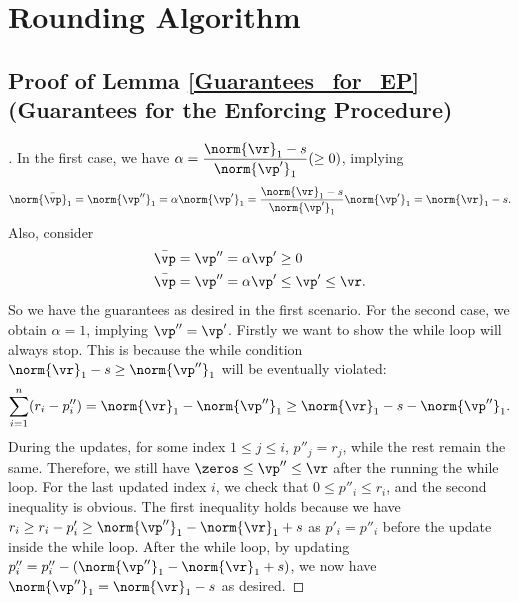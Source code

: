 \section{Rounding Algorithm} 
\subsection{Proof of Lemma \ref{Guarantees_for_EP} (Guarantees for the Enforcing Procedure)}
\begin{proof}[\unskip \nopunct]
    In the first case, we have $\alpha = \dfrac{\norm{\vr}_1-s}{\norm{\vp'}_1} (\geq 0)$, implying
    \begin{align*}
        \norm{\bar{\vp}}_1 = \norm{\vp''}_1 = \alpha \norm{\vp'}_1 = \frac{\norm{\vr}_1-s}{\norm{\vp'}_1} \norm{\vp'}_1 = \norm{\vr}_1-s.
    \end{align*}
    Also, consider 
    \begin{align*}
        &\bar{\vp} = \vp'' = \alpha \vp' \geq 0 \\
        &\bar{\vp} = \vp'' = \alpha \vp' \leq \vp' \leq \vr.
    \end{align*}
    So we have the guarantees as desired in the first scenario. For the second case, we obtain $\alpha = 1$, implying $\vp'' = \vp'$. Firstly we want to show the while loop will always stop. This is because the while condition $\norm{\vr}_1 - s \geq \norm{\vp''}_1 $ will be eventually violated:
    \begin{align*}
        \sum_{i=1}^n (r_i - p''_i) = \norm{\vr}_1 - \norm{\vp''}_1 \geq \norm{\vr}_1 - s - \norm{\vp''}_1. 
    \end{align*}
    During the updates, for some index $1 \leq j \leq i$, $p''_j = r_j$, while the rest remain the same. Therefore, we still have $\zeros \leq \vp'' \leq \vr$ after the running the while loop. For the last updated index $i$, we check that $0 \leq p''_i \leq r_i$, and the second inequality is obvious. The first inequality holds because we have $r_i \geq r_i - p'_i \geq \norm{\vp''}_1 - \norm{\vr}_1 +s$ as $p'_i = p''_i$ before the update inside the while loop. After the while loop, by updating $ p''_i = p''_i - (\norm{\vp''}_1 - \norm{\vr}_1 +s)$, we now have  $\norm{\vp''}_1 = \norm{\vr}_1 - s$ as desired.
\end{proof}


